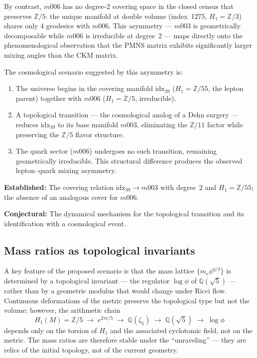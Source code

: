 ﻿\documentclass[12pt]{article}
\theoremstyle{definition}
\begin{document}
By contrast, $m006$ has no degree-2 covering space in the closed
census that preserves $\mathbb{Z}/5$: the unique manifold at double
volume (index~1275, $H_1 = \mathbb{Z}/3$) shares only 4 geodesics with $m006$. This asymmetry --- $m003$ is geometrically
decomposable while $m006$ is irreducible at degree~2 --- maps
directly onto the phenomenological observation that the PMNS matrix
exhibits significantly larger mixing angles than the CKM matrix.

The cosmological scenario suggested by this asymmetry is:
\begin{enumerate}
\item The universe begins in the covering manifold
  $\text{idx}_{39}$ ($H_1 = \mathbb{Z}/55$, the lepton parent)
  together with $m006$ ($H_1 = \mathbb{Z}/5$, irreducible).
\item A topological transition --- the cosmological analog of a
  Dehn surgery --- reduces $\text{idx}_{39}$ to its base manifold
  $m003$, eliminating the $\mathbb{Z}/11$ factor while preserving
  the $\mathbb{Z}/5$ flavor structure.
\item The quark sector ($m006$) undergoes no such transition,
  remaining geometrically irreducible. This structural difference
  produces the observed lepton--quark mixing asymmetry.
\end{enumerate}

\textbf{Established:} The covering relation $\text{idx}_{39}
\to m003$ with degree~2 and $H_1 = \mathbb{Z}/55$; the absence of
an analogous cover for $m006$.

\textbf{Conjectural:} The dynamical mechanism for the topological
transition and its identification with a cosmological event.

\subsection{Mass ratios as topological invariants}

A key feature of the proposed scenario is that the mass lattice
$\{m_e \phi^{q/4}\}$ is determined by a topological invariant ---
the regulator $\log\phi$ of $\mathbb{Q}(\sqrt{5})$ --- rather than
by a geometric modulus that would change under Ricci flow. Continuous
deformations of the metric preserve the topological type but not
the volume; however, the arithmetic chain
\[
  H_1(M) = \mathbb{Z}/5 \;\longrightarrow\; e^{2\pi i/5}
  \;\longrightarrow\; \mathbb{Q}(\zeta_5)
  \;\longrightarrow\; \mathbb{Q}(\sqrt{5})
  \;\longrightarrow\; \log\phi
\]
depends only on the torsion of $H_1$ and the associated cyclotomic
field, not on the metric. The mass ratios are therefore stable under
the ``unraveling'' --- they are relics of the initial topology, not
of the current geometry.
\end{document}
